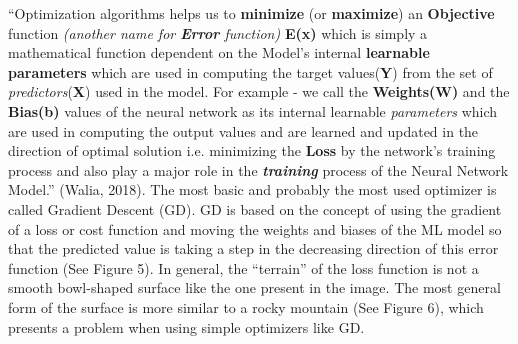 “Optimization algorithms helps us to \textbf{minimize} (or \textbf{maximize}) an \textbf{Objective} function
\textit{(another name for \textbf{Error} function)} \textbf{E(x)} which is simply a mathematical function dependent on the Model’s internal \textbf{learnable parameters}
which are used in computing the target values(\textbf{Y}) from the set of \textit{predictors}(\textbf{X}) used in the model. 
For example - we call the \textbf{Weights(W)} and the \textbf{Bias(b)} values of the neural network as its internal learnable \textit{parameters} 
which are used in computing the output values and are learned and updated in the direction of optimal solution i.e. 
minimizing the \textbf{Loss} by the network’s training process and also play a major role in the \textit{\textbf{training}} process of the Neural Network Model.” (Walia, 2018).
The most basic and probably the most used optimizer is called Gradient Descent (GD). 
GD is based on the concept of using the gradient of a loss or cost function and moving the weights and biases of the ML model so that the predicted value is taking a step in the decreasing direction of this error function (See Figure 5). In general, the “terrain” of the loss function is not a smooth bowl-shaped surface like the one present in the image. The most general form of the surface is more similar to a rocky mountain (See Figure 6), which presents a problem when using simple optimizers like GD.






